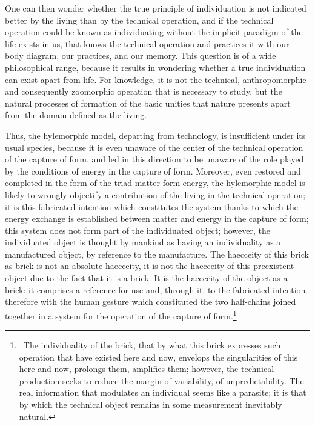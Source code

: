 \documentclass[a4paper]{article}
\begin{document}
One can then wonder whether the true principle of individuation is not indicated better by the living than by the technical operation, and if the technical operation could be known as individuating without the implicit paradigm of the life exists in us, that knows the technical operation and practices it with our body diagram, our practices, and our memory. This question is of a wide philosophical range, because it results in wondering whether a true individuation can exist apart from life. For knowledge, it is not the technical, anthropomorphic and consequently zoomorphic operation that is necessary to study, but the natural processes of formation of the basic unities that nature presents apart from the domain defined as the living.

Thus, the hylemorphic model, departing from technology, is insufficient under its usual species, because it is even unaware of the center of the technical operation of the capture of form, and led in this direction to be unaware of the role played by the conditions of energy in the capture of form. Moreover, even restored and completed in the form of the triad matter-form-energy, the hylemorphic model is likely to wrongly objectify a contribution of the living in the technical operation; it is this fabricated intention which constitutes the system thanks to which the energy exchange is established between matter and energy in the capture of form; this system does not form part of the individuated object; however, the individuated object is thought by mankind as having an individuality as a manufactured object, by reference to the manufacture. The haecceity of this brick as brick is not an absolute haecceity, it is not the haecceity of this preexistent object due to the fact that it is a brick. It is the haecceity of the object as a brick: it comprises a reference for use and, through it, to the fabricated intention, therefore with the human gesture which constituted the two half-chains joined together in a system for the operation of the capture of form.\footnote{\ The individuality of the brick, that by what this brick expresses such operation that have existed here and now, envelops the singularities of this here and now, prolongs them, amplifies them; however, the technical production seeks to reduce the margin of variability, of unpredictability. The real information that modulates an individual seems like a parasite; it is that by which the technical object remains in some measurement inevitably natural.}
\end{document}
